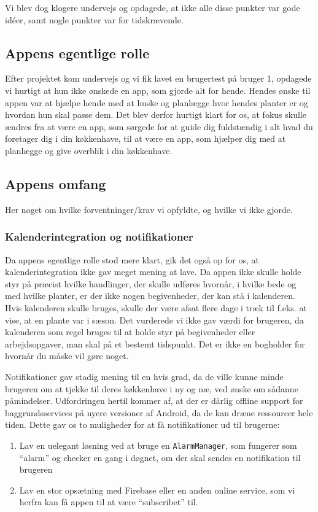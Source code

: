 Vi blev dog klogere undervejs og opdagede, at ikke alle disse punkter var gode idéer, samt nogle punkter var for tidskrævende.

\subsection{Appens egentlige rolle}
Efter projektet kom undervejs og vi fik lavet en brugertest på bruger 1, opdagede vi hurtigt at hun ikke ønskede en app, som gjorde alt for hende. Hendes ønske til appen var at hjælpe hende med at huske og planlægge hvor hendes planter er og hvordan hun skal passe dem. Det blev derfor hurtigt klart for os, at fokus skulle ændres fra at være en app, som sørgede for at guide dig fuldstændig i alt hvad du foretager dig i din køkkenhave, til at være en app, som hjælper dig med at planlægge og give overblik i din køkkenhave.

\subsection{Appens omfang}
Her noget om hvilke forventninger/krav vi opfyldte, og hvilke vi ikke gjorde.

\subsubsection{Kalenderintegration og notifikationer}
Da appens egentlige rolle stod mere klart, gik det også op for os, at kalenderintegration ikke gav meget mening at lave. Da appen ikke skulle holde styr på præcist hvilke handlinger, der skulle udføres hvornår, i hvilke bede og med hvilke planter, er der ikke nogen begivenheder, der kan stå i kalenderen. Hvis kalenderen skulle bruges, skulle der være afsat flere dage i træk til f.eks. at vise, at en plante var i sæson. Det vurderede vi ikke gav værdi for brugeren, da kalenderen som regel bruges til at holde styr på begivenheder eller arbejdsopgaver, man skal på et bestemt tidspunkt. Det er ikke en bogholder for hvornår du måske vil gøre noget.

Notifikationer gav stadig mening til en hvis grad, da de ville kunne minde brugeren om at tjekke til deres køkkenhave i ny og næ, ved ønske om sådanne påmindelser. Udfordringen hertil kommer af, at der er dårlig offline support for baggrundsservices på nyere versioner af Android, da de kan dræne ressourcer hele tiden. Dette gav os to muligheder for at få notifikationer ud til brugerne:

\begin{enumerate}
    \item Lav en uelegant løsning ved at bruge en \texttt{AlarmManager}, som fungerer som ``alarm'' og checker en gang i døgnet, om der skal sendes en notifikation til brugeren
    \item Lav en stor opsætning med Firebase eller en anden online service, som vi herfra kan få appen til at være ``subscribet'' til.
\end{enumerate}


